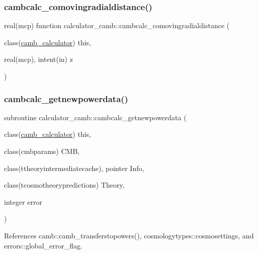 \subsubsection{\texorpdfstring{cambcalc\+\_\+comovingradialdistance()}{cambcalc\_comovingradialdistance()}}
{\footnotesize\ttfamily real(mcp) function calculator\+\_\+camb\+::cambcalc\+\_\+comovingradialdistance (\begin{DoxyParamCaption}\item[{class(\mbox{\hyperlink{structcalculator__camb_1_1camb__calculator}{camb\+\_\+calculator}})}]{this,  }\item[{real(mcp), intent(in)}]{z }\end{DoxyParamCaption})}

\mbox{\label{namespacecalculator__camb_ad7195d220a7f5bc77479225b47d91d17}} 
\subsubsection{\texorpdfstring{cambcalc\+\_\+getnewpowerdata()}{cambcalc\_getnewpowerdata()}}
{\footnotesize\ttfamily subroutine calculator\+\_\+camb\+::cambcalc\+\_\+getnewpowerdata (\begin{DoxyParamCaption}\item[{class(\mbox{\hyperlink{structcalculator__camb_1_1camb__calculator}{camb\+\_\+calculator}})}]{this,  }\item[{class(cmbparams)}]{C\+MB,  }\item[{class(ttheoryintermediatecache), pointer}]{Info,  }\item[{class(tcosmotheorypredictions)}]{Theory,  }\item[{integer}]{error }\end{DoxyParamCaption})}



References camb\+::camb\+\_\+transferstopowers(), cosmologytypes\+::cosmosettings, and errors\+::global\+\_\+error\+\_\+flag.

